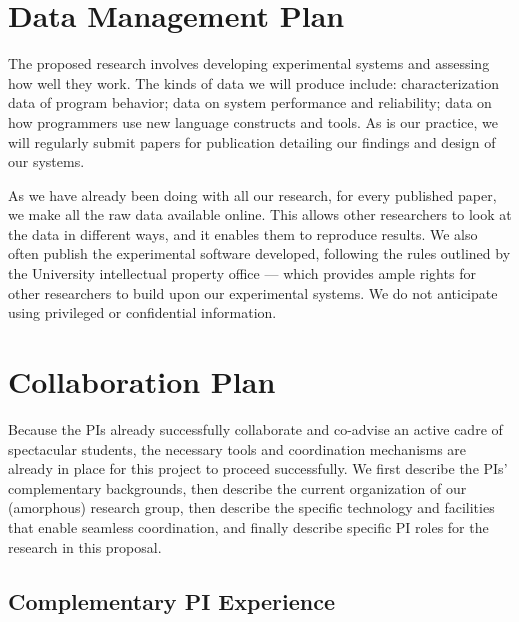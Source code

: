 
\newpage

\section*{Data Management Plan}

The proposed research involves developing experimental systems and
assessing how well they work. The kinds of data we will produce
include: characterization data of program behavior; data on system
performance and reliability; data on how programmers use new language
constructs and tools. As is our practice, we will regularly submit
papers for publication detailing our findings and design of our
systems.

As we have already been doing with all our research, for every
published paper, we make all the raw data available online. This
allows other researchers to look at the data in different ways, and it
enables them to reproduce results. We also often publish
the experimental software developed, following the rules outlined by
the University intellectual property office --- which provides ample
rights for other researchers to build upon our experimental
systems. We do not anticipate using privileged or confidential
information. 

\newpage
\section*{Collaboration Plan}

Because the PIs already successfully collaborate and co-advise an
active cadre of spectacular students, the necessary tools and
coordination mechanisms are already in place for this project to
proceed successfully.  We first describe the PIs' complementary
backgrounds, then describe the current organization of our (amorphous)
research group, then describe the specific technology and facilities
that enable seamless coordination, and finally describe specific PI roles
for the research in this proposal.

\subsection*{Complementary PI Experience}

